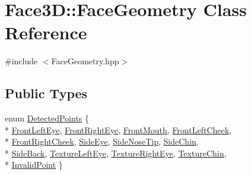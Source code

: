 \hypertarget{class_face3_d_1_1_face_geometry}{}\section{Face3D\+:\+:Face\+Geometry Class Reference}
\label{class_face3_d_1_1_face_geometry}


{\ttfamily \#include $<$Face\+Geometry.\+hpp$>$}

\subsection*{Public Types}
\begin{DoxyCompactItemize}
\item 
enum \hyperlink{class_face3_d_1_1_face_geometry_aab597f00966010882927a4974649bf11}{Detected\+Points} \{ \\*
\hyperlink{class_face3_d_1_1_face_geometry_aab597f00966010882927a4974649bf11a3b8d42b7b6a50b21aa7b45f91d6ca101}{Front\+Left\+Eye}, 
\hyperlink{class_face3_d_1_1_face_geometry_aab597f00966010882927a4974649bf11a8f7e43bdc4f5063cbd2077f07839fefa}{Front\+Right\+Eye}, 
\hyperlink{class_face3_d_1_1_face_geometry_aab597f00966010882927a4974649bf11ae026cb5d275298596d8271989547f308}{Front\+Mouth}, 
\hyperlink{class_face3_d_1_1_face_geometry_aab597f00966010882927a4974649bf11a25003b7445b9bd1e32893e182fb7a64e}{Front\+Left\+Cheek}, 
\\*
\hyperlink{class_face3_d_1_1_face_geometry_aab597f00966010882927a4974649bf11a50f3b130a82bbb888aea798da7593158}{Front\+Right\+Cheek}, 
\hyperlink{class_face3_d_1_1_face_geometry_aab597f00966010882927a4974649bf11ae6070e4323042c54fd618a58ee59096d}{Side\+Eye}, 
\hyperlink{class_face3_d_1_1_face_geometry_aab597f00966010882927a4974649bf11aede62853a8d83e60bedafd0ad9fccaf6}{Side\+Nose\+Tip}, 
\hyperlink{class_face3_d_1_1_face_geometry_aab597f00966010882927a4974649bf11a4dc0a580b65985a111a42af5bec1c4d1}{Side\+Chin}, 
\\*
\hyperlink{class_face3_d_1_1_face_geometry_aab597f00966010882927a4974649bf11adfaa5defb1292f1feaa168235cbcc5ff}{Side\+Back}, 
\hyperlink{class_face3_d_1_1_face_geometry_aab597f00966010882927a4974649bf11a645e3accf36dcc84d39f389bf086a486}{Texture\+Left\+Eye}, 
\hyperlink{class_face3_d_1_1_face_geometry_aab597f00966010882927a4974649bf11a02343df464cc8f17becb3d60df94d977}{Texture\+Right\+Eye}, 
\hyperlink{class_face3_d_1_1_face_geometry_aab597f00966010882927a4974649bf11a0507d043e77cf67c967bb77c0efb98f7}{Texture\+Chin}, 
\\*
\hyperlink{class_face3_d_1_1_face_geometry_aab597f00966010882927a4974649bf11aef08736c0cf92fe26e5d281571ac319d}{Invalid\+Point}
 \}
\end{DoxyCompactItemize}
